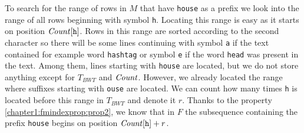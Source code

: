 To search for the range of rows in $M$ that have {\tt house} as a prefix we look into the range of all
rows beginning with symbol {\tt h}. Locating this range is easy as it starts on position
$\mathit{Count}[\texttt{h}]$. Rows in this range are sorted according to the second character so there will be
some lines continuing with symbol {\tt a} if the text contained for example word {\tt hashtag} or symbol
{\tt e} if the word {\tt head} was present in the text. Among them, lines starting with {\tt house} are
located, but we do not store anything except for $T_{BWT}$ and $\mathit{Count}$. However, we already located the
range where suffixes starting with {\tt ouse} are located. We can count how many times {\tt h} is located
before this range in $T_{BWT}$ and denote it $r$. Thanks to the property \ref{chapter1:fmindexprop:prop2},
we know that in $F$ the subsequence containing the prefix {\tt house} begins on position $\mathit{Count}[\texttt{h}]+r$.

